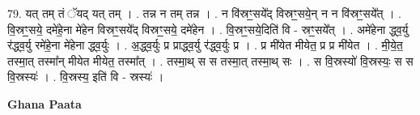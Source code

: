 \documentclass[17pt]{extarticle}
\begin{document}
79. यत् तम् तं ॅयद् यत् तम् । . तन्न न तम् तन्न । . न वि॑स्रꣳ॒॒सये᳚द् विस्रꣳ॒॒सये॒न् न न वि॑स्रꣳ॒॒सये᳚त् । . वि॒स्रꣳ॒॒सये॒ दमे॑हे॒ना मे॑हेन विस्रꣳ॒॒सये᳚द् विस्रꣳ॒॒सये॒ दमे॑हेन । . वि॒स्रꣳ॒॒सये॒दिति॑ वि - स्रꣳ॒॒सये᳚त् । . अमे॑हेना द्ध्व॒र्यु र॑द्ध्व॒र्यु रमे॑हे॒ना मे॑हेना द्ध्व॒र्युः । . अ॒द्ध्व॒र्युः प्र प्राद्ध्व॒र्यु र॑द्ध्व॒र्युः प्र । . प्र मी॑येत मीयेत॒ प्र प्र मी॑येत । . मी॒ये॒त॒ तस्मा॒त् तस्मा᳚न् मीयेत मीयेत॒ तस्मा᳚त् । . तस्मा॒थ् स स तस्मा॒त् तस्मा॒थ् सः । . स वि॒स्रस्यो॑ वि॒स्रस्यः॒ स स वि॒स्रस्यः॑ । . वि॒स्रस्य॒ इति॑ वि - स्रस्यः॑ । \newline

\textbf{Ghana Paata } \newline
\end{document}
